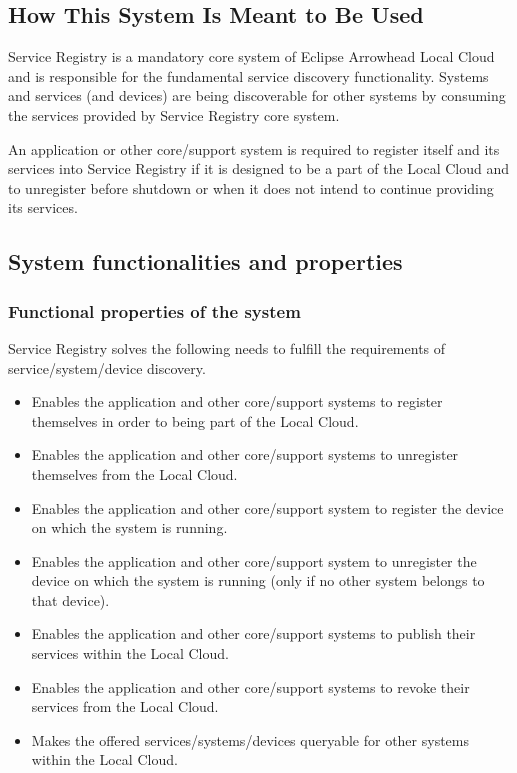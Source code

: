 \documentclass[a4paper]{arrowhead}
\begin{document}
\subsection{How This System Is Meant to Be Used}
\label{sec:use}

Service Registry is a mandatory core system of Eclipse Arrowhead Local Cloud and is responsible for the fundamental service discovery functionality. Systems and services (and devices) are being discoverable for other systems by consuming the services provided by Service Registry core system.

An application or other core/support system is required to register itself and its services into Service Registry if it is designed to be a part of the Local Cloud and to unregister before shutdown or when it does not intend to continue providing its services.

\subsection{System functionalities and properties}
\label{sec:properties}

\subsubsection {Functional properties of the system}
Service Registry solves the following needs to fulfill the requirements of service/system/device discovery.

\begin{itemize}
    \item Enables the application and other core/support systems to register themselves in order to being part of the Local Cloud.
    \item Enables the application and other core/support systems to unregister themselves from the Local Cloud.
    \item Enables the application and other core/support system to register the device on which the system is running.
    \item Enables the application and other core/support system to unregister the device on which the system is running (only if no other system belongs to that device).
    \item Enables the application and other core/support systems to publish their services within the Local Cloud.
    \item Enables the application and other core/support systems to revoke their services from the Local Cloud.
    \item Makes the offered services/systems/devices queryable for other systems within the Local Cloud.
\end{itemize}
\end{document}
